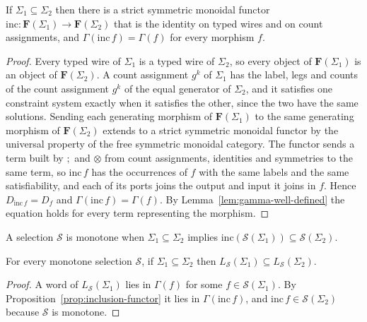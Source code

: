 \begin{proposition}
  \label{prop:inclusion-functor}
  If $\Sigma_1\subseteq\Sigma_2$ then there is a strict symmetric monoidal functor
  $\mathrm{inc}\colon\mathbf{F}(\Sigma_1)\to\mathbf{F}(\Sigma_2)$ that is the identity on typed wires
  and on count assignments, and $\Gamma(\mathrm{inc}\,f)=\Gamma(f)$ for every morphism $f$.
\end{proposition}
\begin{proof}
  Every typed wire of $\Sigma_1$ is a typed wire of $\Sigma_2$, so every object of
  $\mathbf{F}(\Sigma_1)$ is an object of $\mathbf{F}(\Sigma_2)$. A count assignment $g^{k}$ of
  $\Sigma_1$ has the label, legs and counts of the count assignment $g^{k}$ of the equal generator of
  $\Sigma_2$, and it satisfies one constraint system exactly when it satisfies the other, since the
  two have the same solutions. Sending each generating morphism of $\mathbf{F}(\Sigma_1)$ to the same
  generating morphism of $\mathbf{F}(\Sigma_2)$ extends to a strict symmetric monoidal functor by
  the universal property of the free symmetric monoidal category. The functor sends a term built by
  $;$ and $\otimes$ from count assignments, identities and symmetries to the same term, so
  $\mathrm{inc}\,f$ has the occurrences of $f$ with the same labels and the same satisfiability, and
  each of its ports joins the output and input it joins in $f$. Hence $D_{\mathrm{inc}\,f}=D_f$ and
  $\Gamma(\mathrm{inc}\,f)=\Gamma(f)$. By Lemma~\ref{lem:gamma-well-defined} the equation holds for
  every term representing the morphism.
\end{proof}

A selection $\mathcal{S}$ is monotone when $\Sigma_1\subseteq\Sigma_2$ implies
$\mathrm{inc}(\mathcal{S}(\Sigma_1))\subseteq\mathcal{S}(\Sigma_2)$.

\begin{corollary}
  \label{cor:signature-inclusion}
  For every monotone selection $\mathcal{S}$, if $\Sigma_1\subseteq\Sigma_2$ then
  $L_{\mathcal{S}}(\Sigma_1)\subseteq L_{\mathcal{S}}(\Sigma_2)$.
\end{corollary}
\begin{proof}
  A word of $L_{\mathcal{S}}(\Sigma_1)$ lies in $\Gamma(f)$ for some $f\in\mathcal{S}(\Sigma_1)$. By
  Proposition~\ref{prop:inclusion-functor} it lies in $\Gamma(\mathrm{inc}\,f)$, and
  $\mathrm{inc}\,f\in\mathcal{S}(\Sigma_2)$ because $\mathcal{S}$ is monotone.
\end{proof}

